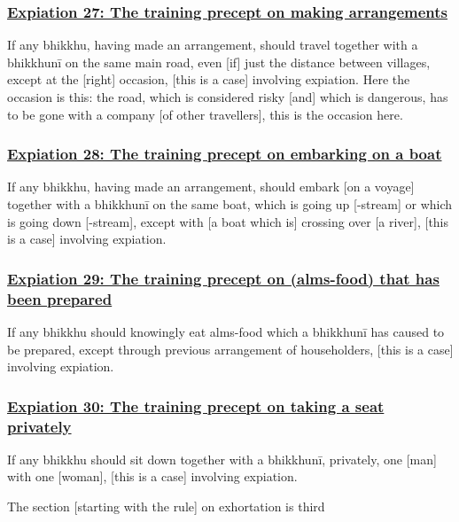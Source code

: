 \subsubsection*{\hyperref[pac27]{Expiation 27: The training precept on making arrangements}}
\label{exp27}
If any bhikkhu, having made an arrangement, should travel together with a bhikkhunī on the same main road, even [if] just the distance between villages, except at the [right] occasion, [this is a case] involving expiation. Here the occasion is this: the road, which is considered risky [and] which is dangerous, has to be gone with a company [of other travellers], this is the occasion here.



\subsubsection*{\hyperref[pac28]{Expiation 28: The training precept on embarking on a boat}}
\label{exp28}
If any bhikkhu, having made an arrangement, should embark [on a voyage] together with a bhikkhunī on the same boat, which is going up [-stream] or which is going down [-stream], except with [a boat which is] crossing over [a river], [this is a case] involving expiation.



\subsubsection*{\hyperref[pac29]{Expiation 29: The training precept on (alms-food) that has been prepared}}
\label{exp29}
If any bhikkhu should knowingly eat alms-food which a bhikkhunī has caused to be prepared, except through previous arrangement of householders, [this is a case] involving expiation.



\subsubsection*{\hyperref[pac30]{Expiation 30: The training precept on taking a seat privately}}
\label{exp30}
If any bhikkhu should sit down together with a bhikkhunī, privately, one [man] with one [woman], [this is a case] involving expiation.

\begin{center}
	The section [starting with the rule] on exhortation is third
\end{center}



